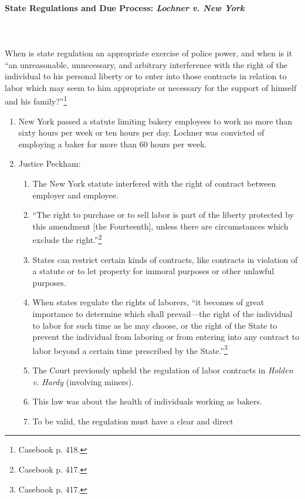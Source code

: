 \paragraph{State Regulations and Due Process: \emph{Lochner v. New York}}
~\\\\
When is state regulation an appropriate exercise of police power, and when is 
it ``an unreasonable, unnecessary, and arbitrary interference with the right 
of the individual to his personal liberty or to enter into those contracts in 
relation to labor which may seem to him appropriate or necessary for the 
support of himself and his family?''\footnote{Casebook p. 418.}

\begin{enumerate}
    \item New York passed a statute limiting bakery employees to work no more 
    than sixty hours per week or ten hours per day. Lochner was convicted of 
    employing a baker for more than 60 hours per week.
    \item Justice Peckham:
    \begin{enumerate}
        \item The New York statute interfered with the right of contract 
        between employer and employee.
        \item ``The right to purchase or to sell labor is part of the liberty 
        protected by this amendment [the Fourteenth], unless there are 
        circumstances which exclude the right.''\footnote{Casebook p. 417.}
        \item States can restrict certain kinds of contracts, like contracts 
        in violation of a statute or to let property for immoral purposes or 
        other unlawful purposes.
        \item When states regulate the rights of laborers, ``it becomes of 
        great importance to determine which shall prevail---the right of the 
        individual to labor for such time as he may choose, or the right of 
        the State to prevent the individual from laboring or from entering 
        into any contract to labor beyond a certain time prescribed by the 
        State.''\footnote{Casebook p. 417.}
        \item The Court previously upheld the regulation of labor contracts in 
        \emph{Holden v. Hardy} (involving miners).
        \item This law was about the health of individuals working as bakers.
        \item To be valid, the regulation must have a clear and direct 

\end{enumerate}
\end{enumerate}
